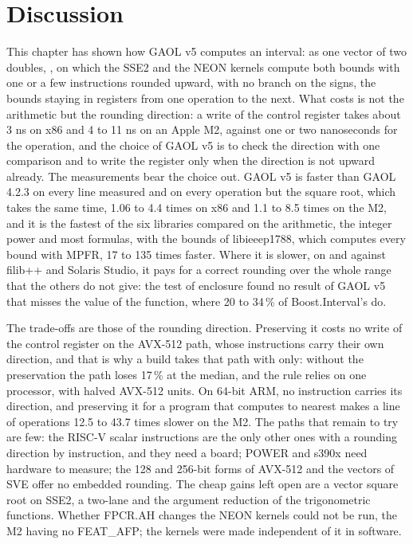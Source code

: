 \documentclass[12pt,a4paper,twoside,openright]{book}
\begin{document}
\section{Discussion}

This chapter has shown how GAOL v5 computes an interval: as one vector of two
doubles, , on which the SSE2 and the NEON kernels
compute both bounds with one or a few instructions rounded upward, with no
branch on the signs, the bounds staying in registers from one operation to
the next. What costs is not the arithmetic but the rounding direction: a
write of the control register takes about 3 ns on x86 and 4 to 11 ns on an
Apple M2, against one or two nanoseconds for the operation, and the choice
of GAOL v5 is to check the direction with one comparison and to write the
register only when the direction is not upward already. The measurements
bear the choice out. GAOL v5 is faster than GAOL 4.2.3 on every line measured and on every
operation but the square root, which takes the same time, 1.06 to 4.4 times
on x86 and 1.1 to 8.5 times on
the M2, and it is the fastest of the six libraries compared on the
arithmetic, the integer power and most formulas, with the bounds of
libieeep1788, which computes every bound with MPFR, 17 to 135 times faster.
Where it is slower, on  and  against filib++ and Solaris
Studio, it pays for a correct rounding over the whole range that the others
do not give: the test of enclosure found no result of GAOL v5 that misses
the value of the function, where 20 to 34\,\% of Boost.Interval's do.

\medskip
The trade-offs are those of the rounding direction. Preserving it costs
no write of the control register on the AVX-512 path, whose instructions carry their own direction,
and that is why a build takes that path with 
only: without the preservation the path loses 17\,\% at the median, and the
rule relies on one processor, with halved AVX-512 units. On 64-bit ARM, no
instruction carries its direction, and preserving it for a program that
computes to nearest makes a line of operations 12.5 to 43.7 times slower on
the M2. The paths that remain to try are few: the RISC-V scalar
instructions are the only other ones with a rounding direction by
instruction, and they need a board; POWER and s390x need hardware to
measure; the 128 and 256-bit forms of AVX-512 and the vectors of SVE offer
no embedded rounding. The cheap gains left open are a vector square root on
SSE2, a two-lane  and the argument reduction of the
trigonometric functions. Whether FPCR.AH changes the NEON kernels could not
be run, the M2 having no FEAT\_AFP; the kernels were made independent of it
in software.
\end{document}
